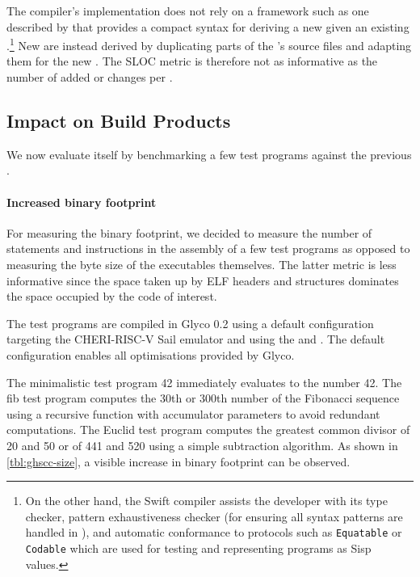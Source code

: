 \documentclass[main.tex]{subfiles}
\begin{document}
The compiler's implementation does not rely on a framework such as one described by \citet{commcomp} that provides a compact syntax for deriving a new  given an existing .\footnote{On the other hand, the Swift compiler assists the developer with its type checker, pattern exhaustiveness checker (for ensuring all syntax patterns are handled in ), and automatic conformance to protocols such as \texttt{Equatable} or \texttt{Codable} which are used for testing and representing programs as Sisp values.} New  are instead derived by duplicating parts of the 's source files and adapting them for the new . The SLOC metric is therefore not as informative as the number of added  or changes per .

\subsection{Impact on Build Products}
We now evaluate  itself by benchmarking a few test programs against the previous .

\paragraph{Increased binary footprint} For measuring the binary footprint, we decided to measure the number of statements and instructions in the assembly of a few test programs as opposed to measuring the byte size of the executables themselves. The latter metric is less informative since the space taken up by ELF headers and structures dominates the space occupied by the code of interest.

The test programs are compiled in Glyco 0.2 using a default configuration targeting the CHERI-RISC-V Sail emulator and using the  and  . The default configuration enables all optimisations provided by Glyco.

The minimalistic test program 42 immediately evaluates to the number 42. The fib test program computes the 30th or 300th number of the Fibonacci sequence using a recursive function with accumulator parameters to avoid redundant computations. The Euclid test program computes the greatest common divisor of 20 and 50 or of 441 and 520 using a simple subtraction algorithm. As shown in \cref{tbl:ghscc-size}, a visible increase in binary footprint can be observed.
\end{document}
